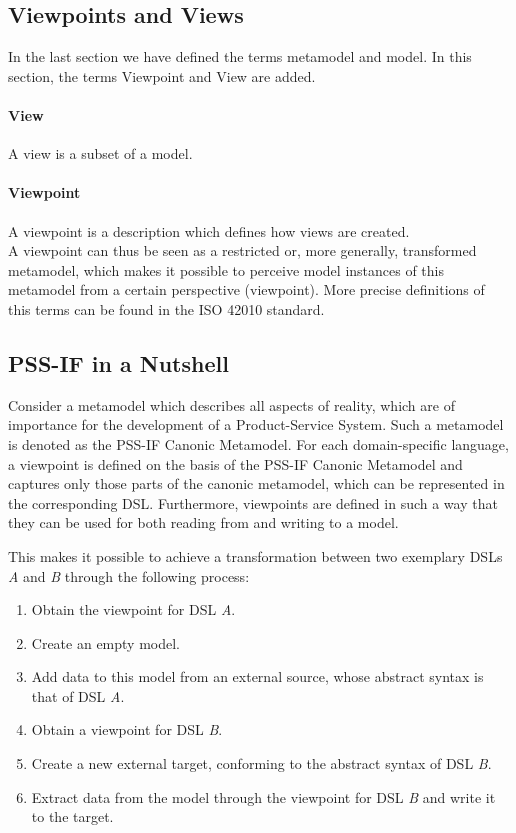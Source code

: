 \subsection{Viewpoints and Views}

In the last section we have defined the terms metamodel and model. In this section, the terms Viewpoint and View are added.

\paragraph{View} A view is a subset of a model.

\paragraph{Viewpoint} A viewpoint is a description which defines how views are created.\\

A viewpoint can thus be seen as a restricted or, more generally, transformed metamodel, which makes it possible to perceive model instances of this metamodel from a certain perspective (viewpoint). More precise definitions of this terms can be found in the ISO 42010 standard.

\subsection{PSS-IF in a Nutshell}

Consider a metamodel which describes all aspects of reality, which are of importance for the development of a Product-Service System. Such a metamodel is denoted as the PSS-IF Canonic Metamodel. For each domain-specific language, a viewpoint is defined on the basis of the PSS-IF Canonic Metamodel and captures only those parts of the canonic metamodel, which can be represented in the corresponding DSL. Furthermore, viewpoints are defined in such a way that they can be used for both reading from and writing to a model.

This makes it possible to achieve a transformation between two exemplary DSLs \textit{A} and \textit{B} through the following process:

\begin{enumerate}
\item Obtain the viewpoint for DSL \textit{A}.
\item Create an empty model.
\item Add data to this model from an external source, whose abstract syntax is that of DSL \textit{A}.
\item Obtain a viewpoint for DSL \textit{B}.
\item Create a new external target, conforming to the abstract syntax of DSL \textit{B}.
\item Extract data from the model through the viewpoint for DSL \textit{B} and write it to the target.
\end{enumerate}

